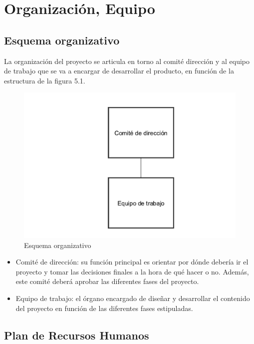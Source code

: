 \chapter{Organización, Equipo}

\section{Esquema organizativo}

La organización del proyecto se articula en torno al comité dirección y al equipo de trabajo que se va a encargar de desarrollar el producto, en función de la estructura de la figura 5.1.

\begin{figure}[!htp]
	\centering
	\includegraphics[scale=.75]{fig/organization}
	\caption{Esquema organizativo}
\end{figure}

\begin{itemize}
	\item Comité de dirección: su función principal es orientar por dónde debería ir el proyecto y tomar las decisiones finales a la hora de qué hacer o no.  Además, este comité deberá aprobar las diferentes fases del proyecto.
	\item Equipo de trabajo: el órgano encargado de diseñar y desarrollar el contenido del proyecto en función de las diferentes fases estipuladas.
\end{itemize}

\section{Plan de Recursos Humanos}

